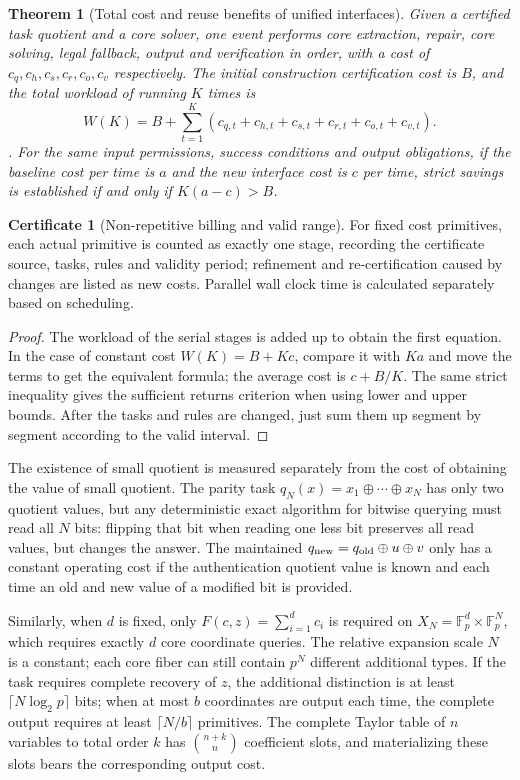 \documentclass[11pt,a4paper]{article}
\theoremstyle{plain}
\newtheorem{theorem}{Theorem}[section]
\theoremstyle{definition}
\newtheorem*{certificate}{Certificate}
\theoremstyle{remark}
\begin{document}
\begin{CJK*}
\begin{theorem}
[Total cost and reuse benefits of unified interfaces]\label{pc:cost}
Given a certified task quotient and a core solver, one event performs core extraction, repair, core solving, legal fallback, output and verification in order, with a cost of $c_q,c_h,c_s,c_r,c_o,c_v$ respectively. The initial construction certification cost is $B$, and the total workload of running $K$ times is \[
 W(K)=B+\sum_{t=1}^K
 (c_{q,t}+c_{h,t}+c_{s,t}+c_{r,t}+c_{o,t}+c_{v,t}).
\]. For the same input permissions, success conditions and output obligations, if the baseline cost per time is $a$ and the new interface cost is $c$ per time, strict savings is established if and only if $K(a-c)>B$.\end{theorem}
\begin{certificate}
[Non-repetitive billing and valid range]For fixed cost primitives, each actual primitive is counted as exactly one stage, recording the certificate source, tasks, rules and validity period; refinement and re-certification caused by changes are listed as new costs. Parallel wall clock time is calculated separately based on scheduling.\end{certificate}
\begin{proof}
The workload of the serial stages is added up to obtain the first equation. In the case of constant cost $W(K)=B+Kc$, compare it with $Ka$ and move the terms to get the equivalent formula; the average cost is $c+B/K$. The same strict inequality gives the sufficient returns criterion when using lower and upper bounds. After the tasks and rules are changed, just sum them up segment by segment according to the valid interval.\end{proof}


The existence of small quotient is measured separately from the cost of obtaining the value of small quotient. The parity task $q_N(x)=x_1\oplus\cdots\oplus x_N$ has only two quotient values, but any deterministic exact algorithm for bitwise querying must read all $N$ bits: flipping that bit when reading one less bit preserves all read values, but changes the answer. The maintained $q_{\rm new}=q_{\rm old}\oplus u\oplus v$ only has a constant operating cost if the authentication quotient value is known and each time an old and new value of a modified bit is provided.

Similarly, when $d$ is fixed, only $F(c,z)=\sum_{i=1}^dc_i$ is required on $X_N=\mathbb F_p^d\times\mathbb F_p^N$, which requires exactly $d$ core coordinate queries. The relative expansion scale $N$ is a constant; each core fiber can still contain $p^N$ different additional types. If the task requires complete recovery of $z$, the additional distinction is at least $\lceil N\log_2p\rceil$ bits; when at most $b$ coordinates are output each time, the complete output requires at least $\lceil N/b\rceil$ primitives. The complete Taylor table of $n$ variables to total order $k$ has $\binom{n+k}{n}$ coefficient slots, and materializing these slots bears the corresponding output cost.


\end{CJK*}
\end{document}
